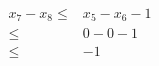 \begin{equation}
    \begin{aligned}
      x_7 - x_8 \leq & x_5 - x_6 - 1 \\
        \leq & 0 - 0 - 1 \\
        \leq & -1
    \end{aligned}
    \label{eq:split2}
\end{equation}




